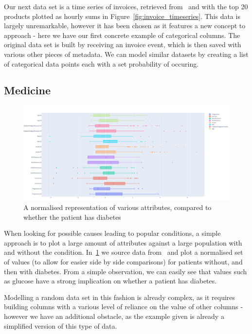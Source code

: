 Our next data set is a time series of invoices, retrieved from~\cite{UCIMLRepo} and with the top 20 products plotted
as hourly sums in Figure~\ref{fig:invoice_timeseries}.
This data is largely unremarkable, however it has been chosen as it features a new concept to approach - here we have
our first concrete example of categorical columns.
The original data set is built by receiving an invoice event, which is then saved with various other pieces of metadata.
We can model similar datasets by creating a list of categorical data points each with a set probability of occuring.


\subsection{Medicine}

\begin{figure}[H]
    \centering
    \includegraphics[width=12cm]{figures/real_data_examples/diabetes_attributes}
    \caption{A normalised representation of various attributes, compared to whether the patient has diabetes}
    \label{fig:real_data_diabetes}
\end{figure}

When looking for possible causes leading to popular conditions, a simple approach is to plot a large amount of
attributes against a large population with and without the condition.
In~\ref{fig:real_data_diabetes} we source data from~\cite{KaggleDiabetes} and plot a normalised set of values (to allow
for easier side by side comparisons) for patients without, and then with diabetes.
From a simple observation, we can easily see that values such as glucose have a strong implication on whether a patient
has diabetes.

Modelling a random data set in this fashion is already complex, as it requires building columns with a various level of
reliance on the value of other columns - however we have an additional obstacle, as the example given is already a
simplified version of this type of data.


